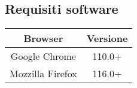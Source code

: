 \subsection{Requisiti software}

\begin{center}
\begin{tabular}{ | c | c |}
		\hline
        \rowcolor{gray!30}
		\textbf{Browser} & \textbf{Versione} \\ 
		\hline
        \rowcolor{gray!10}
        Google Chrome & 110.0+ \\
        \hline
        \rowcolor{gray!10}
        Mozzilla Firefox & 116.0+ \\
        \hline
\end{tabular}
\end{center}